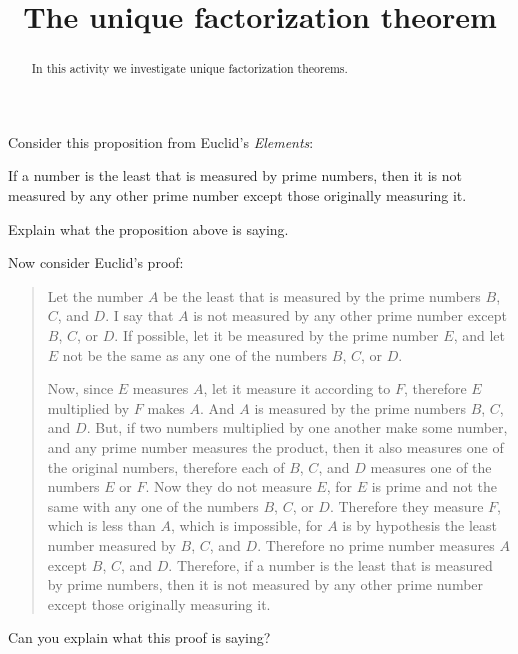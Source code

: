 \documentclass{ximera}
\title{The unique factorization theorem}
\begin{document}
\begin{abstract}
In this activity we investigate unique factorization theorems.
\end{abstract}
\maketitle


Consider this proposition from Euclid's \textit{Elements}:

\begin{proposition}[IX.14]
If a number is the least that is measured by prime numbers, then it is
not measured by any other prime number except those originally
measuring it.
\end{proposition}

\begin{question}
Explain what the proposition above is saying.
\end{question}


\begin{question}
Now consider Euclid's proof:
\begin{quote}
Let the number $A$ be the least that is measured by the prime numbers
$B$, $C$, and $D$.  I say that $A$ is not measured by any other prime
number except $B$, $C$, or $D$.  If possible, let it be measured by
the prime number $E$, and let $E$ not be the same as any one of the
numbers $B$, $C$, or $D$.

Now, since $E$ measures $A$, let it measure it according to $F$, therefore $E$
multiplied by $F$ makes $A$. And $A$ is measured by the prime numbers $B$, $C$,
and $D$.  But, if two numbers multiplied by one another make some
number, and any prime number measures the product, then it also
measures one of the original numbers, therefore each of $B$, $C$, and $D$
measures one of the numbers $E$ or $F$.  Now they do not measure $E$, for $E$
is prime and not the same with any one of the numbers $B$, $C$, or
$D$. Therefore they measure $F$, which is less than $A$, which is
impossible, for $A$ is by hypothesis the least number measured by $B$, $C$,
and $D$.  Therefore no prime number measures $A$ except $B$, $C$, and $D$.
Therefore, if a number is the least that is measured by prime numbers,
then it is not measured by any other prime number except those
originally measuring it.
\end{quote}
Can you explain what this proof is saying?
\end{question}

\newpage
\end{document}
